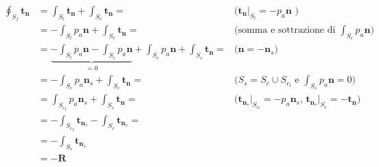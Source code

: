 \begin{itemize}
\begin{equation}
\begin{aligned}
  \oint_{S_f} \bm{t_n} & = 
  \int_{S_l} \bm{t_n} + \int_{S_c} \bm{t_n} = & \text{($\bm{t_n} |_{S_l} = -p_a \bm{n}$ )}\\
  & = - \int_{S_l} p_a \bm{n} + \int_{S_c} \bm{t_n} = & \text{(somma e sottrazione di $\int_{S_c} p_a \bm{n}$)}\\
  & = \underbrace{- \int_{S_l} p_a \bm{n} - \int_{S_c} p_a \bm{n}}_{=0}
  + \int_{S_c} p_a \bm{n} + \int_{S_c} \bm{t_n} = & \text{($\bm{n} = -\bm{n}_{s}$)} \\
  & = - \int_{S_c} p_a \bm{n}_{s} + \int_{S_c} \bm{t_n} = &
  \text{($S_{s} = S_c \cup S_{c_l}$ e $\int_{S_{s}} p_a \bm{n} = 0$)}\\
  & = \int_{{S_c}_l} p_a \bm{n}_{s} + \int_{S_c} \bm{t_n} = &
  \text{($\bm{t}_{\bm{n}_{s}}|_{S_{c_l}} = -p_a \bm{n}_{s}$, $\bm{t}_{\bm{n}_{s}}|_{S_c} = - \bm{t_n}$)} \\
  & = - \int_{{S_c}_l} \bm{t}_{\bm{n}_{s}} - \int_{S_c} \bm{t}_{\bm{n}_{s}} = \\
  & = - \int_{S_{s}} \bm{t}_{\bm{n}_{s}} \\
  & = - \bm{R}
\end{aligned}
\end{equation}
%




\end{itemize}
